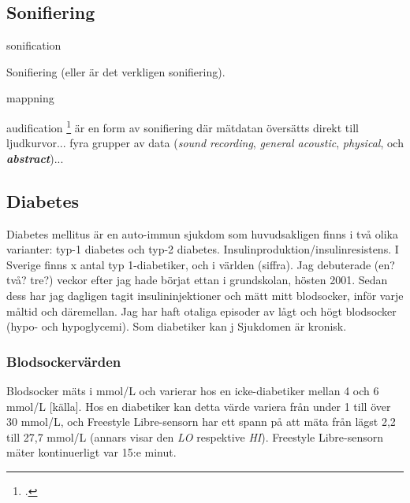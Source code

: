 \documentclass[11pt, a4paper]{article} %
\begin{document}



\subsection*{Sonifiering}

\gls{sonification}


Sonifiering (eller är det verkligen sonifiering). %

\gls{mappning}

\gls{audification} \footcite[302]{hermann_audification_2011} är en form av sonifiering där mätdatan översätts direkt till ljudkurvor... fyra grupper av data (\emph{sound recording}, \emph{general acoustic}, \emph{physical}, och \textbf{\emph{abstract}})...


\subsection*{Diabetes}

Diabetes mellitus är en auto-immun sjukdom som huvudsakligen finns i två olika varianter: typ-1 diabetes och typ-2 diabetes. Insulinproduktion/insulinresistens. I Sverige finns x antal typ 1-diabetiker, och i världen (siffra). Jag debuterade (en? två? tre?) veckor efter jag hade börjat ettan i grundskolan, hösten 2001. Sedan dess har jag dagligen tagit insulininjektioner och mätt mitt blodsocker, inför varje måltid och däremellan. Jag har haft otaliga episoder av lågt och högt blodsocker (hypo- och hypoglycemi). Som diabetiker kan j Sjukdomen är kronisk.


\subsubsection*{Blodsockervärden}
Blodsocker mäts i mmol/L och varierar hos en icke-diabetiker mellan 4 och 6 mmol/L [källa]. Hos en diabetiker kan detta värde variera från under 1 till över 30 mmol/L, och Freestyle Libre-sensorn har ett spann på att mäta från lägst 2,2 till 27,7 mmol/L (annars visar den \emph{LO} respektive \emph{HI}). Freestyle Libre-sensorn mäter kontinuerligt var 15:e minut.
\end{document}
